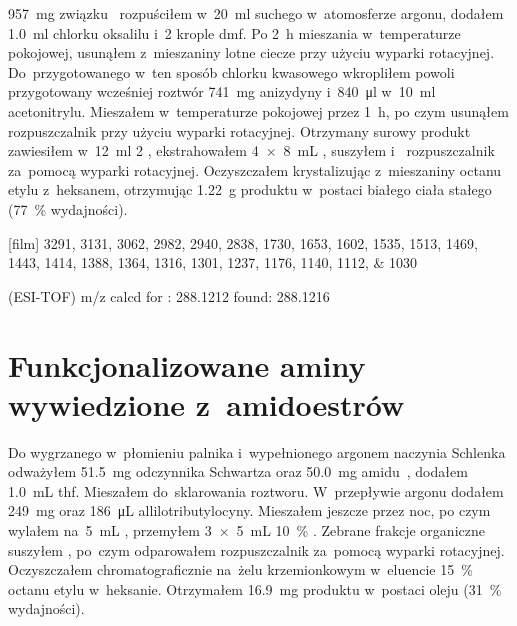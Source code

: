 \SI{957}{\mg} związku~ rozpuściłem w~\SI{20}{\ml}
  suchego  w~atomosferze argonu, dodałem \SI{1.0}{\ml} chlorku oksalilu
  i~\num{2} krople \gls{dmf}.
Po \SI{2}{\hour} mieszania w~temperaturze pokojowej, usunąłem z~mieszaniny lotne ciecze
  przy użyciu wyparki rotacyjnej.
Do~przygotowanego w~ten sposób chlorku kwasowego wkropliłem powoli przygotowany wcześniej roztwór
  \SI{741}{\mg} anizydyny i~\SI{840}{\ul}  w~\SI{10}{\ml} acetonitrylu.
Mieszałem w~temperaturze pokojowej przez \SI{1}{\hour}, po czym usunąłem rozpuszczalnik
  przy użyciu wyparki rotacyjnej.
Otrzymany surowy produkt zawiesiłem w~\SI{12}{\ml} \SI{2}{\Molar} ,
  ekstrahowałem \SI[product-units = single]{4 x 8}{\mL} , suszyłem 
  i~ rozpuszczalnik za~pomocą wyparki rotacyjnej.
Oczyszczałem krystalizując z~mieszaniny octanu etylu z~heksanem, otrzymując \SI{1.22}{\gram}
  produktu w~postaci białego ciała stałego (\SI{77}{\percent} wydajności).

\begin{fullexp}
  [film] \numlist{3291; 3131; 3062; 2982; 2940; 2838; 1730; 1653; 1602; 1535; 1513; 1469; 1443; 1414; 1388; 1364; 1316; 1301; 1237; 1176; 1140; 1112; 1030}\par\noindent
   (ESI-TOF) m/z calcd for : \num{288.1212} found: \num{288.1216}
\end{fullexp}



\section{Funkcjonalizowane aminy wywiedzione z~amidoestrów}\label{experimental:amidoester-products}
Do wygrzanego w~płomieniu palnika i~wypełnionego argonem naczynia Schlenka odważyłem
  \SI{51.5}{\mg} odczynnika Schwartza oraz \SI{50.0}{\mg} amidu~,
  dodałem \SI{1.0}{\mL} \gls{thf}.
Mieszałem do~sklarowania roztworu.
W~przepływie argonu dodałem \SI{249}{\mg}  oraz \SI{186}{\uL} allilotributylocyny.
Mieszałem jeszcze przez noc, po czym wylałem na~\SI{5}{\mL} ,
  przemyłem \SI[product-units = single]{3 x 5}{\mL} \SI{10}{\percent} .
Zebrane frakcje organiczne suszyłem , po~czym odparowałem rozpuszczalnik za~pomocą
  wyparki rotacyjnej.
Oczyszczałem chromatograficznie na~żelu krzemionkowym w~eluencie \SI{15}{\percent} octanu
  etylu w~heksanie.
Otrzymałem \SI{16.9}{\mg} produktu w~postaci oleju (\SI{31}{\percent} wydajności).

